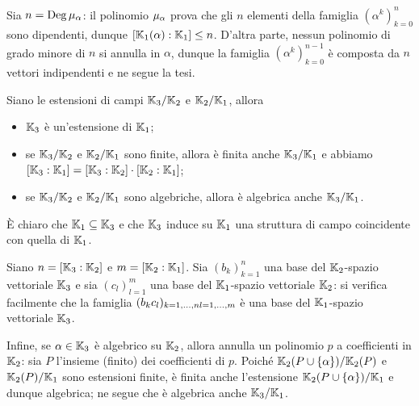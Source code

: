 \Proof Sia $n = \Deg \MinimalPolynomial{\alpha}$: il polinomio $\MinimalPolynomial{\alpha}$ prova che gli $n$ elementi della famiglia $(\alpha^k)_{k = 0}^n$ sono dipendenti, dunque $[\mathbb{K}_1(\alpha):\mathbb{K}_1] \leq n$. D'altra parte, nessun polinomio di grado minore di $n$ si annulla in $\alpha$, dunque la famiglia $(\alpha^k)_{k = 0}^{n - 1}$ \`e composta da $n$ vettori indipendenti e ne segue la tesi. \EndProof
\begin{Theorem}\label{thEstensioniTorri}
	Siano le estensioni di campi $\mathbb{K}_3/\mathbb{K}_2$ e $\mathbb{K}_2/\mathbb{K}_1$, allora
	\begin{itemize}
		\item $\mathbb{K}_3$ \`e un'estensione di $\mathbb{K}_1$;
		\item se $\mathbb{K}_3/\mathbb{K}_2$ e $\mathbb{K}_2/\mathbb{K}_1$ sono finite, allora \`e finita anche $\mathbb{K}_3/\mathbb{K}_1$ e abbiamo $[\mathbb{K}_3:\mathbb{K}_1] = [\mathbb{K}_3:\mathbb{K}_2] \cdot [\mathbb{K}_2:\mathbb{K}_1]$;
		\item se $\mathbb{K}_3/\mathbb{K}_2$ e $\mathbb{K}_2/\mathbb{K}_1$ sono algebriche, allora \`e algebrica anche $\mathbb{K}_3/\mathbb{K}_1$.
	\end{itemize}
\end{Theorem}
\Proof \`E chiaro che $\mathbb{K}_1 \subseteq \mathbb{K}_3$ e che $\mathbb{K}_3$ induce su $\mathbb{K}_1$ una struttura di campo coincidente con quella di $\mathbb{K}_1$.
\par Siano $n = [\mathbb{K}_3:\mathbb{K}_2]$ e $m = [\mathbb{K}_2:\mathbb{K}_1]$. Sia $(b_k)_{k = 1}^n$ una base del $\mathbb{K}_2$-spazio vettoriale $\mathbb{K}_3$ e sia $(c_l)_{l = 1}^m$ una base del $\mathbb{K}_1$-spazio vettoriale $\mathbb{K}_2$: si verifica facilmente che la famiglia $(b_k c_l)_{k = 1, ..., n\\l = 1, ..., m}$ \`e una base del $\mathbb{K}_1$-spazio vettoriale $\mathbb{K}_3$.
\par Infine, se $\alpha \in \mathbb{K}_3$ \`e algebrico su $\mathbb{K}_2$, allora annulla un polinomio $p$ a coefficienti in $\mathbb{K}_2$: sia $P$ l'insieme (finito) dei coefficienti di $p$. Poich\'e $\mathbb{K}_2(P \cup \lbrace \alpha \rbrace)/\mathbb{K}_2(P)$ e $\mathbb{K}_2(P)/\mathbb{K}_1$ sono estensioni finite, \`e finita anche l'estensione $\mathbb{K}_2(P \cup \lbrace \alpha \rbrace)/\mathbb{K}_1$ e dunque algebrica; ne segue che \`e algebrica anche $\mathbb{K}_3/\mathbb{K}_1$. \EndProof
